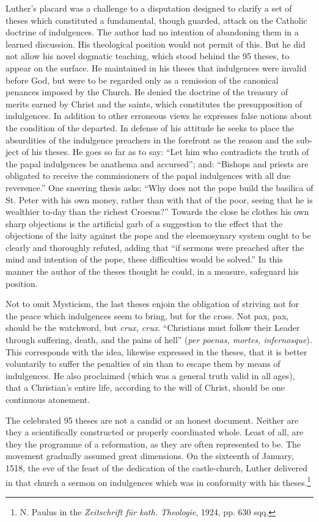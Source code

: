 Luther’s placard was a challenge to a disputation designed to clarify a
set of theses which constituted a fundamental, though guarded,
attack on the Catholic doctrine of indulgences. The author had no
intention of abandoning them in a learned discussion. His theological
position would not permit of this. But he did not allow his novel
dogmatic teaching, which stood behind the 95 theses, to appear on
the surface. He maintained in his theses that indulgences were invalid
before God, but were to be regarded only as a remission of the
canonical penances imposed by the Church. He denied the doctrine
of the treasury of merits earned by Christ and the saints, which
constitutes the presupposition of indulgences. In addition to other
erroneous views he expresses false notions about the condition of the
departed. In defense of his attitude he seeks to place the absurdities
of the indulgence preachers in the forefront as the reason and the sub-
ject of his theses. He goes so far as to say: “Let him who contradicts
the truth of the papal indulgences be anathema and accursed”; and:
“Bishops and priests are obligated to receive the commissioners of
the papal indulgences with all due reverence.” One sneering thesis
asks: “Why does not the pope build the basilica of St. Peter with his
own money, rather than with that of the poor, seeing that he is
wealthier to-day than the richest Croesus?” Towards the close he
clothes his own sharp objections is the artificial garb of a suggestion
to the effect that the objections of the laity against the pope and the
eleemosynary system ought to be clearly and thoroughly refuted,
adding that “if sermons were preached after the mind and intention
of the pope, these difficulties would be solved.” In this manner the
author of the theses thought he could, in a measure, safeguard his
position.

Not to omit Mysticism, the last theses enjoin the obligation of
striving not for the peace which indulgences seem to bring, but for
the cross. Not pax, pax, should be the watchword, but \textit{crux, crux}.
“Christians must follow their Leader through suffering, death, and
the pains of hell” (\textit{per poenas, mortes, infernosque}). This corresponds
with the idea, likewise expressed in the theses, that it is better voluntarily
to suffer the penalties of sin than to escape them by means of indulgences.
He also proclaimed (which was a general truth valid in
all ages), that a Christian’s entire life, according to the will of Christ,
should be one continuous atonement.

The celebrated 95 theses are not a candid or an honest document.
Neither are they a scientifically constructed or properly coordinated
whole. Least of all, are they the programme of a reformation, as they
are often represented to be.
The movement gradually assumed great dimensions. On the sixteenth
of January, 1518, the eve of the feast of the dedication of the
castle-church, Luther delivered in that church a sermon on indulgences
which was in conformity with his theses.\footnote
{N. Paulus in the \textit{Zeitschrift für kath. Theologie}, 1924, pp. 630 sqq.}

